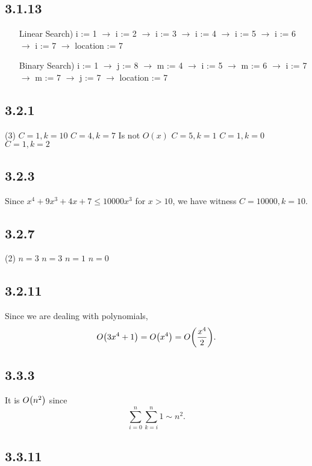 \documentclass[12pt,titlepage]{extarticle}
\begin{document}
\subsection*{3.1.13}
\begin{enumerate}[leftmargin=3cm]
    \item[Linear Search)] i := 1 $\to$ i := 2 $\to$ i := 3 $\to$ i := 4 $\to$ i := 5 $\to$ i := 6 $\to$ i := 7 $\to$ location := 7
    \item[Binary Search)] i := 1 $\to$ j := 8 $\to$ m := 4 $\to$ i := 5 $\to$ m := 6 $\to$ i := 7 $\to$ m := 7 $\to$ j := 7 $\to$ location := 7
\end{enumerate}

\subsection*{3.2.1}
\begin{tasks}(3)
    \task $C = 1, k = 10$
    \task $C = 4, k = 7 $
    \task Is not $O(x)$ 
    \task $C = 5, k = 1 $
    \task $C = 1, k = 0 $
    \task $C = 1, k = 2 $
\end{tasks}

\subsection*{3.2.3}
Since $x^4 + 9x^3 + 4x + 7 \leq 10000x^3$ for $x > 10$, we have witness $C = 10000, k = 10$.

\subsection*{3.2.7}
\begin{tasks}(2)
    \task $n = 3$
    \task $n = 3$
    \task $n = 1$
    \task $n = 0$
\end{tasks}

\subsection*{3.2.11}
Since we are dealing with polynomials,
\[
    O\qty(3x^4 + 1) = O\qty(x^4) = O\qty(\frac{x^4}{2})
.\]

\subsection*{3.3.3}
It is $O\qty(n^2)$ since 
\[
    \sum_{i=0}^n \sum_{k=i}^n 1 \sim n^2
.\]

\subsection*{3.3.11}
\end{document}
